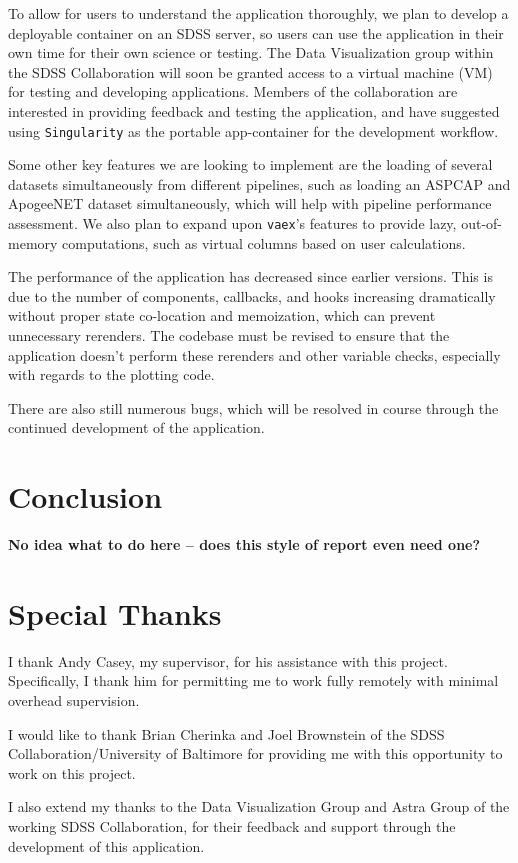 \documentclass[a4paper,10pt,twocolumn]{article}
\begin{document}
To allow for users to understand the application thoroughly, we plan to develop a deployable container on an SDSS server, so users can use the application in their own time for their own science or testing. The Data Visualization group within the SDSS Collaboration will soon be granted access to a virtual machine (VM) for testing and developing applications. Members of the collaboration are interested in providing feedback and testing the application, and have suggested using \texttt{Singularity} \parencite{singularity} as the portable app-container for the development workflow.

Some other key features we are looking to implement are the loading of several datasets simultaneously from different pipelines, such as loading an ASPCAP and ApogeeNET dataset simultaneously, which will help with pipeline performance assessment. We also plan to expand upon \texttt{vaex}'s features to provide lazy, out-of-memory computations, such as virtual columns based on user calculations.

The performance of the application has decreased since earlier versions. This is due to the number of components, callbacks, and hooks increasing dramatically without proper state co-location and memoization, which can prevent unnecessary rerenders. The codebase must be revised to ensure that the application doesn't perform these rerenders and other variable checks, especially with regards to the plotting code.

There are also still numerous bugs, which will be resolved in course through the continued development of the application.

\section{Conclusion}
\label{sec:conclusion}
\textbf{No idea what to do here -- does this style of report even need one?}

\section*{Special Thanks}
I thank Andy Casey, my supervisor, for his assistance with this project. Specifically, I thank him for permitting me to work fully remotely with minimal overhead supervision.

I would like to thank Brian Cherinka and Joel Brownstein of the SDSS Collaboration/University of Baltimore for providing me with this opportunity to work on this project.

I also extend my thanks to the Data Visualization Group and Astra Group of the working SDSS Collaboration, for their feedback and support through the development of this application.
\printbibliography
\end{document}
